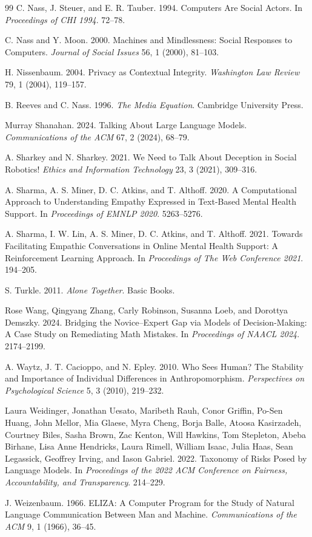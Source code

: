 \documentclass[manuscript,review,anonymous]{acmart}
\begin{document}
\begin{thebibliography}{99}
C. Nass, J. Steuer, and E. R. Tauber.
1994.
Computers Are Social Actors.
In \textit{Proceedings of CHI 1994}. 72--78.

C. Nass and Y. Moon.
2000.
Machines and Mindlessness: Social Responses to Computers.
\textit{Journal of Social Issues} 56, 1 (2000), 81--103.

H. Nissenbaum. 2004.
Privacy as Contextual Integrity.
\textit{Washington Law Review} 79, 1 (2004), 119--157.

B. Reeves and C. Nass.
1996.
\textit{The Media Equation}.
Cambridge University Press.

Murray Shanahan. 2024. Talking About Large Language Models. \textit{Communications of the ACM} 67, 2 (2024), 68--79.

A. Sharkey and N. Sharkey.
2021.
We Need to Talk About Deception in Social Robotics!
\textit{Ethics and Information Technology} 23, 3 (2021), 309--316.

A. Sharma, A. S. Miner, D. C. Atkins, and T. Althoff.
2020.
A Computational Approach to Understanding Empathy Expressed in Text-Based Mental Health Support.
In \textit{Proceedings of EMNLP 2020}. 5263--5276.

A. Sharma, I. W. Lin, A. S. Miner, D. C. Atkins, and T. Althoff.
2021.
Towards Facilitating Empathic Conversations in Online Mental Health Support: A Reinforcement Learning Approach.
In \textit{Proceedings of The Web Conference 2021}. 194--205.

S. Turkle.
2011.
\textit{Alone Together}.
Basic Books.

Rose Wang, Qingyang Zhang, Carly Robinson, Susanna Loeb, and Dorottya Demszky. 2024.
Bridging the Novice--Expert Gap via Models of Decision-Making: A Case Study on Remediating Math Mistakes.
In \textit{Proceedings of NAACL 2024}. 2174--2199.

A. Waytz, J. T. Cacioppo, and N. Epley.
2010.
Who Sees Human? The Stability and Importance of Individual Differences in Anthropomorphism.
\textit{Perspectives on Psychological Science} 5, 3 (2010), 219--232.

Laura Weidinger, Jonathan Uesato, Maribeth Rauh, Conor Griffin, Po-Sen Huang, John Mellor, Mia Glaese, Myra Cheng, Borja Balle, Atoosa Kasirzadeh, Courtney Biles, Sasha Brown, Zac Kenton, Will Hawkins, Tom Stepleton, Abeba Birhane, Lisa Anne Hendricks, Laura Rimell, William Isaac, Julia Haas, Sean Legassick, Geoffrey Irving, and Iason Gabriel. 2022. Taxonomy of Risks Posed by Language Models. In \textit{Proceedings of the 2022 ACM Conference on Fairness, Accountability, and Transparency}. 214--229.

J. Weizenbaum.
1966.
ELIZA: A Computer Program for the Study of Natural Language Communication Between Man and Machine.
\textit{Communications of the ACM} 9, 1 (1966), 36--45.

\end{thebibliography}
\end{document}
